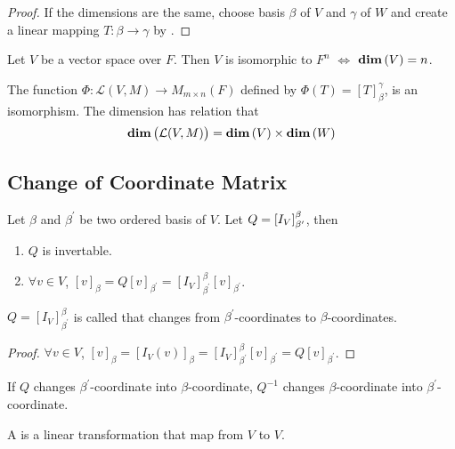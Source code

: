 \begin{proof}
	If the dimensions are the same, choose basis $\beta$ of $V$ and $\gamma$ of $W$ and create a linear mapping $T:\beta \rightarrow \gamma$ by .
\end{proof}


\begin{theorem}
	Let $V$ be a vector space over $F$. Then $V$ is isomorphic to $F^n$ $\Leftrightarrow$ $\displaystyle \mathbf{dim}\left( V \right) = n$.
\end{theorem}


\begin{theorem}
	The function $\Phi: \mathcal{L}(V,M) \rightarrow M_{m \times n}(F)$ defined by $\Phi (T) = [T]_\beta^\gamma$, is an isomorphism. The dimension has relation that 
	\begin{equation}
		\displaystyle \mathbf{dim}\left( \mathcal{L}(V,M) \right) = \displaystyle \mathbf{dim}\left( V \right) \times \displaystyle \mathbf{dim}\left( W \right)
	\end{equation}
\end{theorem}


\subsection{Change of Coordinate Matrix}


\begin{theorem}
	Let $\beta$ and $\beta^\prime$ be two ordered basis of $V$. Let $Q = \coordinate{I_V}_{\beta^\prime}^\beta$, then
	\begin{enumerate}
		\item $Q$ is invertable.
		\item $\forall v \in V$, $[v]_\beta = Q [v]_{\beta^\prime} = [I_V]_{\beta^\prime}^\beta [v]_{\beta^\prime}$.
	\end{enumerate}
	
	$Q= [I_V]_{\beta^\prime}^\beta$ is called  that changes from $\beta^\prime$-coordinates to $\beta$-coordinates.
\end{theorem}

\begin{proof}
    $\forall v \in V $,  $[v]_\beta = [I_V (v)]_\beta =  [I_V]_{\beta^\prime}^\beta [v]_{\beta^\prime} = Q [v]_{\beta^\prime}$.
\end{proof}

If $Q$ changes $\beta^\prime$-coordinate into $\beta$-coordinate, $Q^{-1}$ changes $\beta$-coordinate into $\beta^\prime$-coordinate.

\begin{definition}
	A  is a linear transformation that map from $V$ to $V$.
\end{definition}

